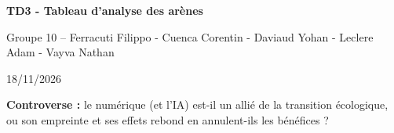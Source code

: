 \documentclass[10pt,a4paper]{article}
\begin{document}
{\color{bleufonce}\LARGE\bfseries TD3 - Tableau d’analyse des arènes}\par\vspace{2pt}
{\color{bleu}\large Groupe 10 -- Ferracuti Filippo - Cuenca Corentin - Daviaud Yohan - Leclere Adam - Vayva Nathan}\par \vspace{2pt}
{\color{bleu}\large 18/11/2026}
\vspace{8pt}

\textbf{Controverse :} le numérique (et l'IA) est-il un allié de la transition écologique, ou son empreinte et ses effets rebond en annulent-ils les bénéfices ?

\vspace{4pt}

\vspace{8pt}
\end{document}
